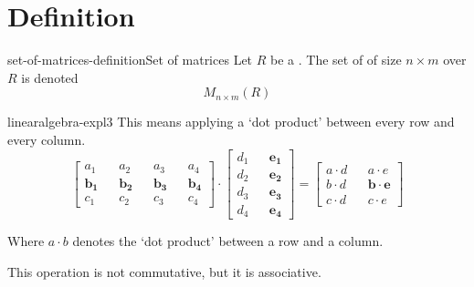 \documentclass[preview]{standalone}
\begin{document}
\genpage

\section{Definition}


\begin{snippetdefinition}{set-of-matrices-definition}{Set of matrices}
    Let \(R\) be a \commutativering. The set of \matrix[matrices]
    of size \(n\times m\) over \(R\) is denoted
    \[M_{n\times m}(R)\]
\end{snippetdefinition}







\begin{snippet}{linearalgebra-expl3}
This means applying a `dot product' between every row and every column. \\

\[
    \begin{bmatrix} 
        a_1 && a_2 && a_3 && a_4 \\
        \mathbf{b_1} && \mathbf{b_2} && \mathbf{b_3} && \mathbf{b_4} \\
        c_1 && c_2 && c_3 && c_4
    \end{bmatrix}
    \cdot
    \begin{bmatrix} 
        d_1 && \mathbf{e_1} \\
        d_2 && \mathbf{e_2} \\
        d_3 && \mathbf{e_3} \\
        d_4 && \mathbf{e_4}
    \end{bmatrix}
    =
    \begin{bmatrix} 
        a \cdot d && a \cdot e \\
        b \cdot d && \mathbf{b \cdot e} \\
        c \cdot d && c \cdot e
    \end{bmatrix}
\]

Where \(a \cdot b\) denotes the `dot product' between a row and a column.

This operation is not commutative, but it is associative.
\end{snippet}
\end{document}

